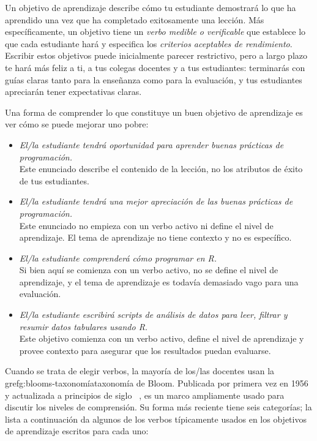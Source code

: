 Un objetivo de aprendizaje describe cómo tu estudiante demostrará lo que ha aprendido
una vez que ha completado exitosamente una lección.
Más específicamente,
un objetivo tiene un \emph{verbo medible o verificable} que establece lo que cada estudiante hará
y especifica los \emph{criterios aceptables de rendimiento}.
Escribir estos objetivos puede inicialmente parecer restrictivo,
pero a largo plazo te hará más feliz a ti,
a tus colegas docentes
y a tus estudiantes:
terminarás con guías claras tanto para la enseñanza como para la evaluación,
y tus estudiantes apreciarán tener expectativas claras.

Una forma de comprender lo que constituye un buen objetivo de aprendizaje
es ver cómo se puede mejorar uno pobre:

 \begin{itemize}
 
\item
  \emph{El/la estudiante tendrá oportunidad para aprender buenas prácticas de programación.}\\
Este enunciado describe el contenido de la lección,
no los atributos de éxito de tus estudiantes.\\
 
\item
  \emph{El/la estudiante tendrá una mejor apreciación
de las buenas prácticas de programación.}\\
 Este enunciado no empieza con un verbo activo ni define el nivel de aprendizaje.
 El tema de aprendizaje no tiene contexto y no es específico.\\
 
\item
  \emph{El/la estudiante comprenderá cómo programar en R.}\\
  Si bien aquí se comienza con un verbo activo,
   no se define el nivel de aprendizaje,
  y el tema de aprendizaje es todavía demasiado vago para una evaluación.\\
 
\item
  \emph{El/la estudiante escribirá scripts de análisis de datos para leer, filtrar y resumir datos tabulares usando R.}\\
 Este objetivo comienza con un verbo activo,
define el nivel de aprendizaje
y provee contexto para asegurar que los resultados puedan evaluarse.
\end{itemize}
 
Cuando se trata de elegir verbos,
la mayoría de los/las docentes usan la gref{g:blooms-taxonomía}{taxonomía de Bloom}.
Publicada por primera vez en 1956 y actualizada a principios de siglo ~\cite{Ande2001},
es un marco ampliamente usado para discutir los niveles de comprensión.
Su forma más reciente tiene seis categorías;
la lista a continuación da algunos de los verbos típicamente usados en los objetivos de aprendizaje escritos para cada uno:


